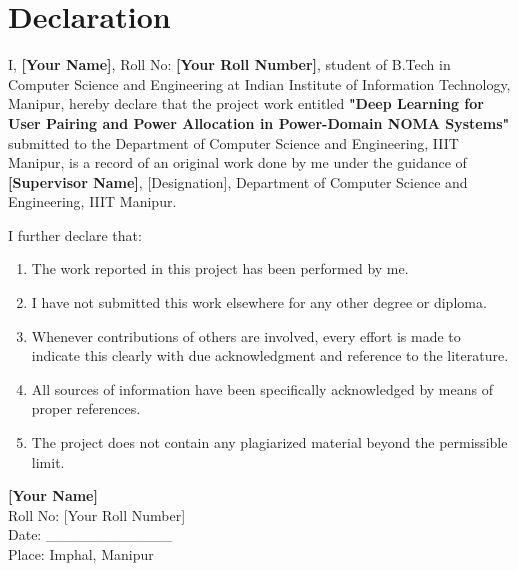 \chapter*{Declaration}

\vspace{1cm}

I, \textbf{[Your Name]}, Roll No: \textbf{[Your Roll Number]}, student of B.Tech in Computer Science and Engineering at Indian Institute of Information Technology, Manipur, hereby declare that the project work entitled \textbf{"Deep Learning for User Pairing and Power Allocation in Power-Domain NOMA Systems"} submitted to the Department of Computer Science and Engineering, IIIT Manipur, is a record of an original work done by me under the guidance of \textbf{[Supervisor Name]}, [Designation], Department of Computer Science and Engineering, IIIT Manipur.

\vspace{1cm}

I further declare that:
\begin{enumerate}
    \item The work reported in this project has been performed by me.
    \item I have not submitted this work elsewhere for any other degree or diploma.
    \item Whenever contributions of others are involved, every effort is made to indicate this clearly with due acknowledgment and reference to the literature.
    \item All sources of information have been specifically acknowledged by means of proper references.
    \item The project does not contain any plagiarized material beyond the permissible limit.
\end{enumerate}

\vspace{2cm}

\begin{flushright}
\textbf{[Your Name]} \\
Roll No: [Your Roll Number] \\
Date: \_\_\_\_\_\_\_\_\_\_\_\_ \\
Place: Imphal, Manipur
\end{flushright}

\newpage

